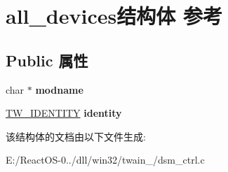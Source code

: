 \hypertarget{structall__devices}{}\section{all\+\_\+devices结构体 参考}
\label{structall__devices}
\subsection*{Public 属性}
\begin{DoxyCompactItemize}
\item 
\mbox{\label{structall__devices_a816e870e11f6dde046637c310c303da4}} 
char $\ast$ {\bfseries modname}
\item 
\mbox{\label{structall__devices_ab4d22217380fbdb67109f45a7e45c2a7}} 
\hyperlink{struct_t_w___i_d_e_n_t_i_t_y}{T\+W\+\_\+\+I\+D\+E\+N\+T\+I\+TY} {\bfseries identity}
\end{DoxyCompactItemize}


该结构体的文档由以下文件生成\+:\begin{DoxyCompactItemize}
\item 
E\+:/\+React\+O\+S-\/0../dll/win32/twain\+\_/dsm\+\_\+ctrl.\+c\end{DoxyCompactItemize}
